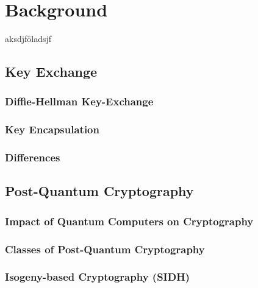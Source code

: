 \chapter{Background}\label{chapter:background}
aksdjföladsjf ~\parencite{alkim2016post}

\section{Key Exchange}

\subsection{Diffie-Hellman Key-Exchange}
\subsection{Key Encapsulation}
\subsection{Differences}

\section{Post-Quantum Cryptography}

\subsection{Impact of Quantum Computers on Cryptography}
\subsection{Classes of Post-Quantum Cryptography}
\subsection{Isogeny-based Cryptography (SIDH)}
